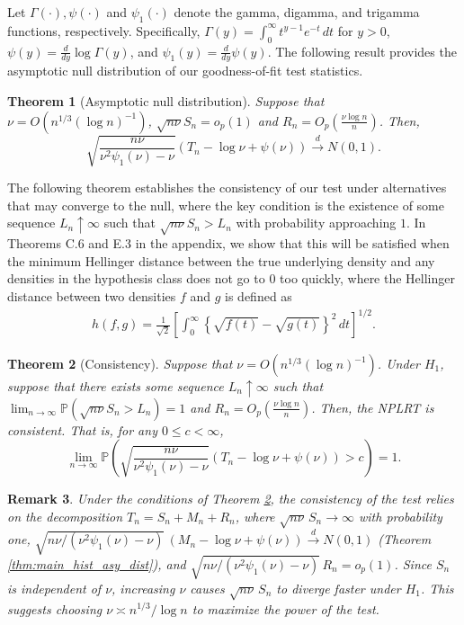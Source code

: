 \documentclass[12pt,letterpaper, twoside, openany]{article}
\theoremstyle{plain}
\newtheorem{theorem}{Theorem}[section]
\newtheorem{remark}[theorem]{Remark}
\begin{document}
Let $\Gamma(\cdot), \psi(\cdot)$ and $\psi_1(\cdot)$ denote the gamma, digamma, and trigamma functions, respectively. Specifically, $\Gamma(y) = \int^\infty_0 t^{y-1}e^{-t}\,dt$ for $y > 0$,  $\psi(y) = \frac{d}{dy}\log \Gamma(y)$, and $\psi_1(y) = \frac{d}{dy} \psi(y)$.  The following result provides the asymptotic null distribution of our goodness-of-fit test statistics.

\begin{theorem}[Asymptotic null distribution]\label{coro:main_result}
Suppose that $\nu = O(n^{1/3}(\log n)^{-1})$, $\sqrt{n \nu} S_n = o_p(1)$ and $R_n = O_p(\frac{\nu \log n}{n})$. Then,
\begin{equation}\label{eq:asy_dist_under_H0}
	\sqrt{ \frac{n\nu}{\nu^2\psi_1(\nu)-\nu}} \left( T_n -  \log \nu +  \psi(\nu) \right) \stackrel{d}{\rightarrow} N(0, 1).
\end{equation}
\end{theorem}

The following theorem establishes the consistency of our test under alternatives that may converge to the null, where the key condition is the existence of some sequence $L_n \uparrow \infty$ such that $\sqrt{n \nu}S_n > L_n$ with probability approaching $1$. In Theorems C.6 and E.3 in the appendix, we show that this will be satisfied when the minimum Hellinger distance between the true underlying density and any densities in the hypothesis class does not go to $0$ too quickly, where the Hellinger distance between two densities $f$ and $g$ is defined as
	\begin{align*}
		h(f,g) = \frac{1}{\sqrt{2}}\left[ \int_0^\infty \left\{ \sqrt{f(t)} - \sqrt{g(t)}\right\}^2\,dt\right]^{1/2}. 
	\end{align*} 

\begin{theorem}[Consistency]\label{corollary:consistency}
Suppose that $\nu = O(n^{1/3}(\log n)^{-1})$. Under $H_1$, suppose that there exists some sequence $L_n \uparrow \infty$ such that $\lim_{n \rightarrow \infty} \mathbb{P}(\sqrt{n \nu }S_n > L_n) = 1$  and $R_n = O_p(\frac{\nu \log n}{n})$. Then, the NPLRT is consistent. That is, for any $0 \leq c < \infty$,
\begin{equation*}
\lim_{n \rightarrow \infty} \mathbb{P}     \left(
\sqrt{ \frac{n\nu}{\nu^2\psi_1(\nu)-\nu}} \left( T_n -  \log \nu +  \psi(\nu) \right) > c\right) = 1.
\end{equation*}
\end{theorem}


\begin{remark}\label{remark:maximize_power}
Under the conditions of Theorem \ref{corollary:consistency}, the consistency of the test relies on the decomposition $T_n = S_n + M_n + R_n$, where $\sqrt{n \nu}\, S_n \to \infty$ with probability one, $\sqrt{n\nu / (\nu^2 \psi_1(\nu) - \nu)}\, (M_n - \log \nu + \psi(\nu)) \stackrel{d}{\rightarrow} N(0,1)$ (Theorem \ref{thm:main_hist_asy_dist}), and $\sqrt{n\nu / (\nu^2 \psi_1(\nu) - \nu)}\, R_n = o_p(1)$. Since $S_n$ is independent of $\nu$, increasing $\nu$ causes $\sqrt{n \nu}\, S_n$ to diverge faster under $H_1$. This suggests choosing $\nu \asymp n^{1/3} / \log n$ to maximize the power of the test.
\end{remark}
\end{document}
